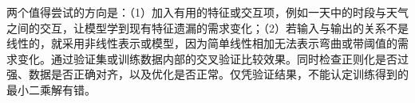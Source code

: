 两个值得尝试的方向是：（1）加入有用的特征或交互项，例如一天中的时段与天气之间的交互，让模型学到现有特征遗漏的需求变化；（2）若输入与输出的关系不是线性的，就采用非线性表示或模型，因为简单线性相加无法表示弯曲或带阈值的需求变化。通过验证集或训练数据内部的交叉验证比较效果。同时检查正则化是否过强、数据是否正确对齐，以及优化是否正常。仅凭验证结果，不能认定训练得到的最小二乘解有错。

